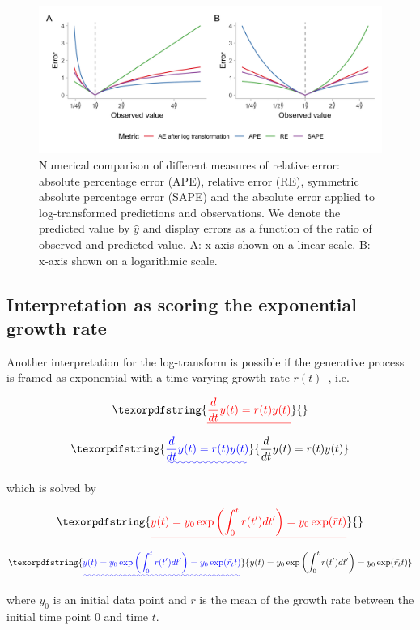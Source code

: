\documentclass{article}
\providecommand{\DIFaddtex}[1]{{\protect\color{blue}\uwave{#1}}} %
\providecommand{\DIFdeltex}[1]{{\protect\color{red}\sout{#1}}}                      %
\providecommand{\DIFaddbegin}{} %
\providecommand{\DIFaddend}{} %
\providecommand{\DIFdelbegin}{} %
\providecommand{\DIFdelend}{} %
\providecommand{\DIFadd}[1]{\texorpdfstring{\DIFaddtex{#1}}{#1}} %
\providecommand{\DIFdel}[1]{\texorpdfstring{\DIFdeltex{#1}}{}} %
\newcommand{\DIFscaledelfig}{0.5}
\newlength{\DIFdelgraphicswidth} %
\newlength{\DIFdelgraphicsheight} %
\newcommand{\DIFaddincludegraphics}[2][]{{\color{blue}\fbox{\DIFOincludegraphics[#1]{#2}}}} %
\newcommand{\DIFdelincludegraphics}[2][]{%
\sbox{\DIFdelgraphicsbox}{\DIFOincludegraphics[#1]{#2}}%
\settoboxwidth{\DIFdelgraphicswidth}{\DIFdelgraphicsbox} %
\settoboxtotalheight{\DIFdelgraphicsheight}{\DIFdelgraphicsbox} %
\scalebox{\DIFscaledelfig}{%
\parbox[b]{\DIFdelgraphicswidth}{\usebox{\DIFdelgraphicsbox}\\[-\baselineskip] \rule{\DIFdelgraphicswidth}{0em}}\llap{\resizebox{\DIFdelgraphicswidth}{\DIFdelgraphicsheight}{%
\setlength{\unitlength}{\DIFdelgraphicswidth}%
\begin{picture}(1,1)%
\thicklines\linethickness{2pt} %
{\color[rgb]{1,0,0}\put(0,0){\framebox(1,1){}}}%
{\color[rgb]{1,0,0}\put(0,0){\line( 1,1){1}}}%
{\color[rgb]{1,0,0}\put(0,1){\line(1,-1){1}}}%
\end{picture}%
}\hspace*{3pt}}} %
} %
\DeclareRobustCommand{\DIFaddbegin}{\DIFOaddbegin \let\includegraphics\DIFaddincludegraphics} %
\DeclareRobustCommand{\DIFaddend}{\DIFOaddend \let\includegraphics\DIFOincludegraphics} %
\DeclareRobustCommand{\DIFdelbegin}{\DIFOdelbegin \let\includegraphics\DIFdelincludegraphics} %
\DeclareRobustCommand{\DIFdelend}{\DIFOaddend \let\includegraphics\DIFOincludegraphics} %
\begin{document}
\begin{figure}[h!]
\centering
\includegraphics[width = 1\textwidth]{output/figures/different-relative-errors.png}
\caption{Numerical comparison of different measures of relative error: absolute percentage error (APE), relative error (RE), symmetric absolute percentage error (SAPE) and the absolute error applied to log-transformed predictions and observations. We denote the predicted value by $\hat{y}$ and display errors as a function of the ratio of observed and predicted value. A: x-axis shown on a linear scale. B: x-axis shown on a logarithmic scale.}
\label{fig:SAPE}
\end{figure}

\subsection{Interpretation as scoring the exponential growth rate}
\label{sec:methods:growthrate}

Another interpretation for the log-transform is possible if the generative process is framed as exponential with a time-varying growth rate $r(t)$~\citep[see, e.g.,][]{wallingaHowGenerationIntervals2007}, i.e.
\begin{linenomath*}
\DIFdelbegin \begin{displaymath}
\DIFdel{\frac{d}{dt}y(t) = r(t)y(t)
}\end{displaymath}%
\DIFdelend \DIFaddbegin \begin{equation}
\DIFadd{\frac{d}{dt}y(t) = r(t)y(t)
}\end{equation}\DIFaddend 
\end{linenomath*}
%
which is solved by
%
\begin{linenomath*}
\DIFdelbegin \begin{displaymath}
\DIFdel{y(t) = y_0 \exp \left( \int_0^t r(t') dt' \right) = y_0 \exp (\bar{r}t)
}\end{displaymath}%
\DIFdelend \DIFaddbegin \begin{equation}
\DIFadd{y(t) = y_0 \exp \left( \int_0^t r(t') dt' \right) = y_0 \exp (\bar{r_t}t)
}\end{equation}\DIFaddend 
\end{linenomath*}
where $y_0$ is an initial data point and \DIFdelbegin \DIFdel{$\bar{r}$ }\DIFdelend \DIFaddbegin \DIFadd{$\bar{r_t}$ }\DIFaddend is the mean of the growth rate between the initial time point $0$ and time $t$.
\end{document}
